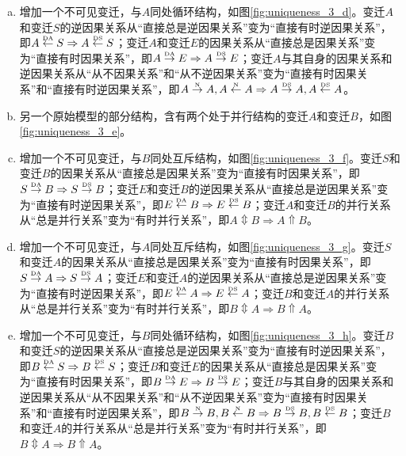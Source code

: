 \begin{enumerate}[(a)]
  \item 增加一个不可见变迁，与$A$同处循环结构，如图\ref{fig:uniqueness_3_d}。变迁$A$和变迁$S$的逆因果关系从“直接总是逆因果关系”变为“直接有时逆因果关系”，即$A\overset{\text{\tiny{DA}}}{\leftarrow}S\Rightarrow A\overset{\text{\tiny{DS}}}{\leftarrow}S$；变迁$A$和变迁$E$的因果关系从“直接总是因果关系”变为“直接有时因果关系”，即$A\overset{\text{\tiny{DA}}}{\rightarrow}E\Rightarrow A\overset{\text{\tiny{DS}}}{\rightarrow}E$；变迁$A$与其自身的因果关系和逆因果关系从“从不因果关系”和“从不逆因果关系”变为“直接有时因果关系”和“直接有时逆因果关系”，即$A\overset{\text{\tiny{N}}}{\rightarrow}A,A\overset{\text{\tiny{N}}}{\leftarrow}A\Rightarrow A\overset{\text{\tiny{DS}}}{\rightarrow}A,A\overset{\text{\tiny{DS}}}{\leftarrow}A$。
  \item 另一个原始模型的部分结构，含有两个处于并行结构的变迁$A$和变迁$B$，如图\ref{fig:uniqueness_3_e}。
  \item 增加一个不可见变迁，与$B$同处互斥结构，如图\ref{fig:uniqueness_3_f}。变迁$S$和变迁$B$的因果关系从“直接总是因果关系”变为“直接有时因果关系”，即$S\overset{\text{\tiny{DA}}}{\rightarrow}B\Rightarrow S\overset{\text{\tiny{DS}}}{\rightarrow}B$；变迁$E$和变迁$B$的逆因果关系从“直接总是逆因果关系”变为“直接有时逆因果关系”，即$E\overset{\text{\tiny{DA}}}{\leftarrow}B\Rightarrow E\overset{\text{\tiny{DS}}}{\leftarrow}B$；变迁$A$和变迁$B$的并行关系从“总是并行关系”变为“有时并行关系”，即$A\Updownarrow B\Rightarrow A\Uparrow B$。
  \item 增加一个不可见变迁，与$A$同处互斥结构，如图\ref{fig:uniqueness_3_g}。变迁$S$和变迁$A$的因果关系从“直接总是因果关系”变为“直接有时因果关系”，即$S\overset{\text{\tiny{DA}}}{\rightarrow}A\Rightarrow S\overset{\text{\tiny{DS}}}{\rightarrow}A$；变迁$E$和变迁$A$的逆因果关系从“直接总是逆因果关系”变为“直接有时逆因果关系”，即$E\overset{\text{\tiny{DA}}}{\leftarrow}A\Rightarrow E\overset{\text{\tiny{DS}}}{\leftarrow}A$；变迁$B$和变迁$A$的并行关系从“总是并行关系”变为“有时并行关系”，即$B\Updownarrow A\Rightarrow B\Uparrow A$。
  \item 增加一个不可见变迁，与$B$同处循环结构，如图\ref{fig:uniqueness_3_h}。变迁$B$和变迁$S$的逆因果关系从“直接总是逆因果关系”变为“直接有时逆因果关系”，即$B\overset{\text{\tiny{DA}}}{\leftarrow}S\Rightarrow B\overset{\text{\tiny{DS}}}{\leftarrow}S$；变迁$B$和变迁$E$的因果关系从“直接总是因果关系”变为“直接有时因果关系”，即$B\overset{\text{\tiny{DA}}}{\rightarrow}E\Rightarrow B\overset{\text{\tiny{DS}}}{\rightarrow}E$；变迁$B$与其自身的因果关系和逆因果关系从“从不因果关系”和“从不逆因果关系”变为“直接有时因果关系”和“直接有时逆因果关系”，即$B\overset{\text{\tiny{N}}}{\rightarrow}B,B\overset{\text{\tiny{N}}}{\leftarrow}B\Rightarrow B\overset{\text{\tiny{DS}}}{\rightarrow}B,B\overset{\text{\tiny{DS}}}{\leftarrow}B$；变迁$B$和变迁$A$的并行关系从“总是并行关系”变为“有时并行关系”，即$B\Updownarrow A\Rightarrow B\Uparrow A$。

\end{enumerate}
